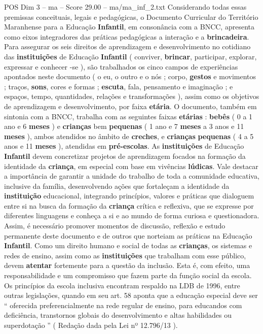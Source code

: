 \begin{textsample}{POS Dim 3 – ma – Score 29.00 – ma/ma\_inf\_2.txt}
Considerando todas essas premissas conceituais, legais e pedagógicas, o Documento Curricular do Território Maranhense para a Educação \textbf{Infantil}, em consonância com a BNCC, apresenta como eixos integradores das práticas pedagógicas a interação e a \textbf{brincadeira}.
Para assegurar os seis direitos de aprendizagem e desenvolvimento no cotidiano das \textbf{instituições} de Educação \textbf{Infantil} ( conviver, \textbf{brincar}, participar, explorar, expressar e conhecer -se ), são trabalhados os cinco campos de experiências apontados neste documento ( o eu, o outro e o nós ; corpo, \textbf{gestos} e movimentos ; traços, \textbf{sons}, cores e formas ; \textbf{escuta}, fala, pensamento e imaginação ; e espaços, tempo, quantidades, relações e transformações ), assim como os objetivos de aprendizagem e desenvolvimento, por faixa \textbf{etária}.
O documento, também em sintonia com a BNCC, trabalha com as seguintes faixas \textbf{etárias} : \textbf{bebês} ( 0 a 1 ano e 6 \textbf{meses} ) e \textbf{crianças} bem \textbf{pequenas} ( 1 ano e 7 \textbf{meses} a 3 anos e 11 \textbf{meses} ), ambos atendidos no âmbito de \textbf{creches}, e \textbf{crianças} \textbf{pequenas} ( 4 a 5 anos e 11 \textbf{meses} ), atendidas em \textbf{pré-escolas}.
As \textbf{instituições} de Educação \textbf{Infantil} devem concretizar projetos de aprendizagem focados na formação da identidade da \textbf{criança}, em especial com base em vivências \textbf{lúdicas}.
Vale destacar a importância de garantir a unidade do trabalho de toda a comunidade educativa, inclusive da família, desenvolvendo ações que fortaleçam a identidade da \textbf{instituição} educacional, integrando princípios, valores e práticas que dialoguem entre si na busca da formação da \textbf{criança} crítica e reflexiva, que se expresse por diferentes linguagens e conheça a si e ao mundo de forma curiosa e questionadora.
Assim, é necessário promover momentos de discussão, reflexão e estudo permanente deste documento e de outros que norteiam as práticas na Educação \textbf{Infantil}.
Como um direito humano e social de todas as \textbf{crianças}, os sistemas e redes de ensino, assim como as \textbf{instituições} que trabalham com esse público, devem \textbf{atentar} fortemente para a questão da inclusão.
Esta é, com efeito, uma responsabilidade e um compromisso que fazem parte da função social da escola.
Os princípios da escola inclusiva encontram respaldo na LDB de 1996, entre outras legislações, quando em seu art. 58 aponta que a educação especial deve ser “ oferecida preferencialmente na rede regular de ensino, para educandos com deficiência, transtornos globais do desenvolvimento e altas habilidades ou superdotação ” ( Redação dada pela Lei nº 12.796/13 ).

\end{textsample}
